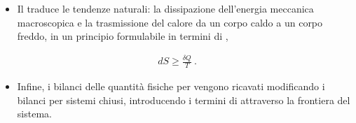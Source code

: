 \documentclass[letterpaper,10pt,italian]{jupyterBook}
\begin{document}
\begin{itemize}
\item {} 
\sphinxAtStartPar
Il {\hyperref[\detokenize{ch/thermodynamics/principles-second:physics-hs-thermodynamics-foundation-principles-second}]{}} traduce le tendenze naturali: la dissipazione dell’energia meccanica macroscopica e la trasmissione del calore da un corpo caldo a un corpo freddo, in un principio formulabile in termini di ,

\end{itemize}
\begin{equation*}
\begin{split}d S \ge \frac{\delta Q}{T} \ .\end{split}
\end{equation*}\begin{itemize}
\item {} 
\sphinxAtStartPar
Infine, i bilanci delle quantità fisiche per {\hyperref[\detokenize{ch/thermodynamics/principles-open:physics-hs-thermodynamics-foundation-principles-open}]{}} vengono ricavati modificando i bilanci per sistemi chiusi, introducendo i termini di  attraverso la frontiera del sistema.

\end{itemize}



\sphinxstepscope
\end{document}
